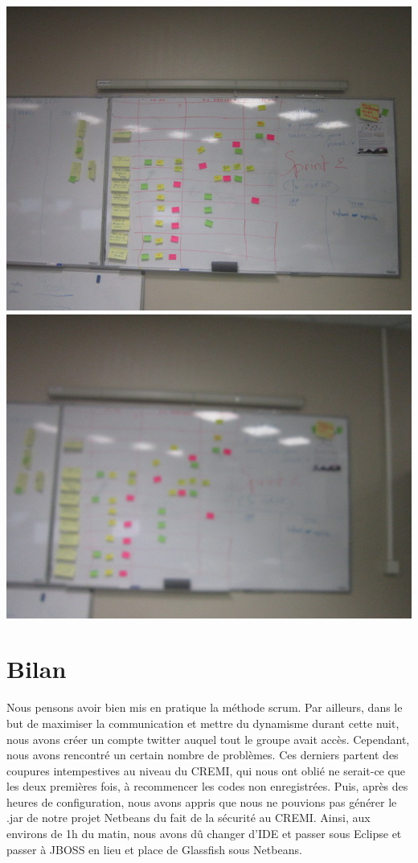 \documentclass[a4paper,francais,titlepage]{report}
\begin{document}
\begin{center}
\includegraphics[scale=0.3]{tableau2.jpeg}
\includegraphics[scale=0.3]{tableau3.jpeg}
\end{center}
\newpage
\section{Bilan}
Nous pensons avoir bien mis en pratique la méthode scrum. Par ailleurs, dans le but de maximiser la communication et mettre du dynamisme durant cette nuit, nous avons créer un compte twitter auquel tout le groupe avait accès. Cependant, nous avons rencontré un certain nombre de problèmes.
Ces derniers partent des coupures intempestives au niveau du CREMI, qui nous ont oblié ne serait-ce que les deux premières fois, à recommencer les codes non enregistrées.
Puis, après des heures de configuration, nous avons appris que nous ne pouvions pas générer le .jar de notre projet Netbeans du fait de la sécurité au CREMI. 
Ainsi, aux environs de 1h du matin, nous avons dû changer d'IDE et passer sous Eclipse et passer à JBOSS en lieu et place de Glassfish sous Netbeans.
\end{document}
